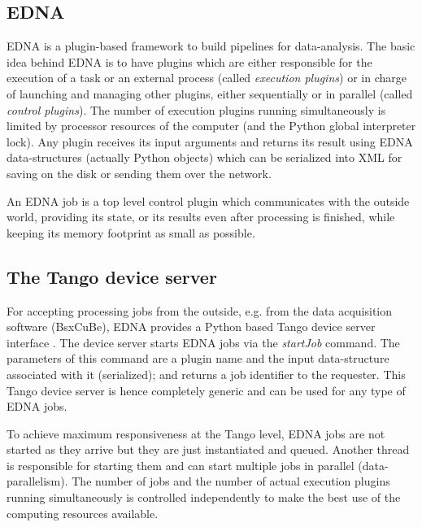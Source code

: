 \documentclass[preprint,pdf]{iucr}              %
\begin{document}


\subsection{EDNA}
EDNA \cite{EDNA} is a plugin-based framework to build pipelines for data-analysis.
The basic idea behind EDNA is to have plugins which are either responsible for the execution
of a task or an external process (called \textit{execution plugins}) or in
charge of launching and managing other plugins, either sequentially or in
parallel (called \textit{control plugins}).
The number of execution plugins running simultaneously is limited by processor
resources of the computer (and the Python global interpreter lock).
Any plugin receives its input arguments and returns its result using
EDNA data-structures (actually Python objects) which can be serialized into XML
for saving on the disk or sending them over the network.

An EDNA job is a top level control plugin which communicates with the outside
world, providing its state, or its results even after processing is finished,
while keeping its memory footprint as small as possible.

\subsection{The Tango device server}
For accepting processing jobs from the outside, e.g. from the data
acquisition software (BsxCuBe), EDNA provides a Python based Tango device
server interface \cite{tango,pytango}.
The device server starts EDNA jobs via the \textit{startJob} command.
The parameters of this command are a plugin name and the input data-structure
associated with it (serialized); and returns a job identifier to the requester.
This Tango device server is hence completely generic and can be used for any
type of EDNA jobs.

To achieve maximum responsiveness at the Tango level, EDNA jobs are not started as
they arrive but they are just instantiated and queued.
Another thread is responsible for starting them and can start multiple jobs in parallel
(data-parallelism).
The number of jobs and the number of actual execution
plugins running simultaneously is controlled independently to make the best use
of the computing resources available.
\end{document}
